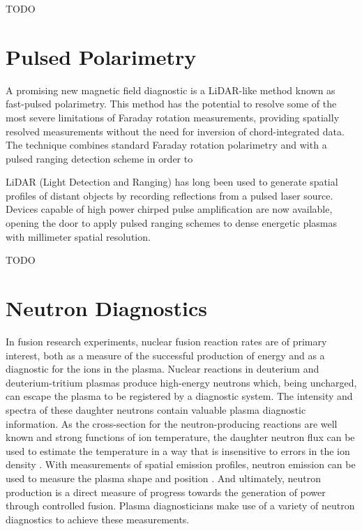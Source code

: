 \documentclass{jpp}
\begin{document}
{\Large TODO \par}
\citep{doi:10.1063/1.1660986}

\section{Pulsed Polarimetry}

A promising new magnetic field diagnostic is a LiDAR-like method known as fast-pulsed polarimetry. This method has the potential to resolve some of the most severe limitations of Faraday rotation measurements, providing spatially resolved measurements without the need for inversion of chord-integrated data. The technique combines standard Faraday rotation polarimetry \citep{Pisarczyk1990} and  with a pulsed ranging detection scheme in order to 

LiDAR (Light Detection and Ranging) has long been used to generate spatial profiles of distant objects by recording reflections from a pulsed laser source. Devices capable of high power chirped pulse amplification \citep{STRICKLAND1985219} are now available, opening the door to apply pulsed ranging schemes to dense energetic plasmas with millimeter spatial resolution.

{\Large TODO \par}

\section{Neutron Diagnostics}

In fusion research experiments, nuclear fusion reaction rates are of primary interest, both as a measure of the successful production of energy and as a diagnostic for the ions in the plasma. Nuclear reactions in deuterium and deuterium-tritium plasmas produce high-energy neutrons which, being uncharged, can escape the plasma to be registered by a diagnostic system. The intensity and spectra of these daughter neutrons contain valuable plasma diagnostic information. As the cross-section for the neutron-producing reactions are well known and strong functions of ion temperature, the daughter neutron flux can be used to estimate the temperature in a way that is insensitive to errors in the ion density \citep[p. 371]{Hutchinson_2002}. With measurements of spatial emission profiles, neutron emission can be used to measure the plasma shape and position \citep{Bielecki2019}. And ultimately, neutron production is a direct measure of progress towards the generation of power through controlled fusion. Plasma diagnosticians make use of a variety of neutron diagnostics to achieve these measurements.
\end{document}

